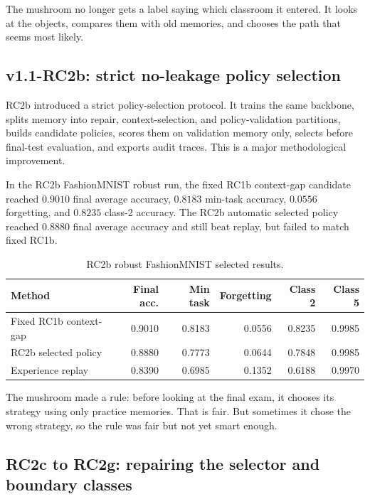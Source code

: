 \documentclass[11pt]{article}
\begin{document}
\begin{kidbox}
The mushroom no longer gets a label saying which classroom it entered. It looks at the objects, compares them with old memories, and chooses the path that seems most likely.
\end{kidbox}

\subsection{v1.1-RC2b: strict no-leakage policy selection}

RC2b introduced a strict policy-selection protocol. It trains the same backbone, splits memory into repair, context-selection, and policy-validation partitions, builds candidate policies, scores them on validation memory only, selects before final-test evaluation, and exports audit traces. This is a major methodological improvement.

In the RC2b FashionMNIST robust run, the fixed RC1b context-gap candidate reached $0.9010$ final average accuracy, $0.8183$ min-task accuracy, $0.0556$ forgetting, and $0.8235$ class-2 accuracy. The RC2b automatic selected policy reached $0.8880$ final average accuracy and still beat replay, but failed to match fixed RC1b.

\begin{table}[h]
\centering
\caption{RC2b robust FashionMNIST selected results.}
\begin{tabular}{lrrrrr}
\toprule
Method & Final acc. & Min task & Forgetting & Class 2 & Class 5 \\
\midrule
Fixed RC1b context-gap & 0.9010 & 0.8183 & 0.0556 & 0.8235 & 0.9985 \\
RC2b selected policy & 0.8880 & 0.7773 & 0.0644 & 0.7848 & 0.9985 \\
Experience replay & 0.8390 & 0.6985 & 0.1352 & 0.6188 & 0.9970 \\
\bottomrule
\end{tabular}
\end{table}

\begin{kidbox}
The mushroom made a rule: before looking at the final exam, it chooses its strategy using only practice memories. That is fair. But sometimes it chose the wrong strategy, so the rule was fair but not yet smart enough.
\end{kidbox}

\subsection{RC2c to RC2g: repairing the selector and boundary classes}
\end{document}
